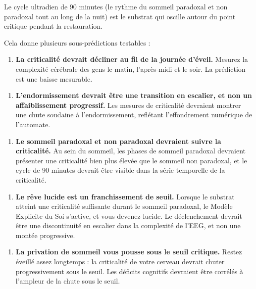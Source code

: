 \documentclass[11pt, twoside, openright]{book}
\begin{document}
Le cycle ultradien de 90 minutes (le rythme du sommeil paradoxal et non paradoxal tout au long de la nuit) est le substrat qui oscille autour du point critique pendant la restauration.

Cela donne plusieurs sous-prédictions testables :

\begin{enumerate}
  \item \textbf{La criticalité devrait décliner au fil de la journée d'éveil.} Mesurez la complexité cérébrale des gens le matin, l'après-midi et le soir. La prédiction est une baisse mesurable.
\end{enumerate}

\begin{enumerate}
  \item \textbf{L'endormissement devrait être une transition en escalier, et non un affaiblissement progressif.} Les mesures de criticalité devraient montrer une chute soudaine à l'endormissement, reflétant l'effondrement numérique de l'automate.
\end{enumerate}

\begin{enumerate}
  \item \textbf{Le sommeil paradoxal et non paradoxal devraient suivre la criticalité.} Au sein du sommeil, les phases de sommeil paradoxal devraient présenter une criticalité bien plus élevée que le sommeil non paradoxal, et le cycle de 90 minutes devrait être visible dans la série temporelle de la criticalité.
\end{enumerate}

\begin{enumerate}
  \item \textbf{Le rêve lucide est un franchissement de seuil.} Lorsque le substrat atteint une criticalité suffisante durant le sommeil paradoxal, le Modèle Explicite du Soi s'active, et vous devenez lucide. Le déclenchement devrait être une discontinuité en escalier dans la complexité de l'EEG, et non une montée progressive.
\end{enumerate}

\begin{enumerate}
  \item \textbf{La privation de sommeil vous pousse sous le seuil critique.} Restez éveillé assez longtemps : la criticalité de votre cerveau devrait chuter progressivement sous le seuil. Les déficits cognitifs devraient être corrélés à l'ampleur de la chute sous le seuil.
\end{enumerate}
\end{document}
